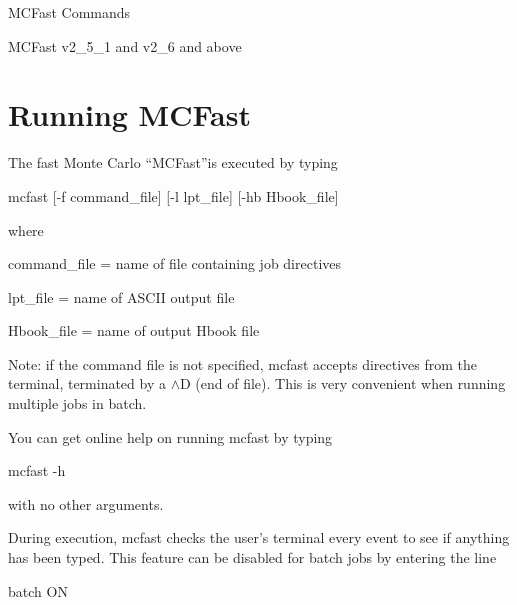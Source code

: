 

\parindent 0pt
\parskip 5mm



\begin{titlepage}




\begin{center}
{\LARGE \sc MCFast Commands}\\
\end{center}

\begin{abstract}
This document contains a description of MCFast commands and command files.    
\\

\end{abstract}
\begin{center}
MCFast v2\_5\_1 and v2\_6 and above \\
\end{center}
\end{titlepage}

\section{Running MCFast}

The fast Monte Carlo ``MCFast''is executed by typing

\centerline{         mcfast [-f command\_file] [-l lpt\_file] [-hb Hbook\_file]}

where 
 
\centerline{        command\_file = name of file containing job directives}
\centerline{        lpt\_file     = name of ASCII output file}
\centerline{        Hbook\_file   = name of output Hbook file}

Note: if the command file is not specified, mcfast accepts
directives from the terminal, terminated by a $\wedge$D (end of file).
This is very convenient when running multiple jobs in batch.

You can get online help on running mcfast by typing

\centerline{        mcfast -h}

with no other arguments.

During execution, mcfast checks the user's terminal every
event to see if anything has been typed. This feature can
be disabled for batch jobs by entering the line

\centerline{  batch ON}

